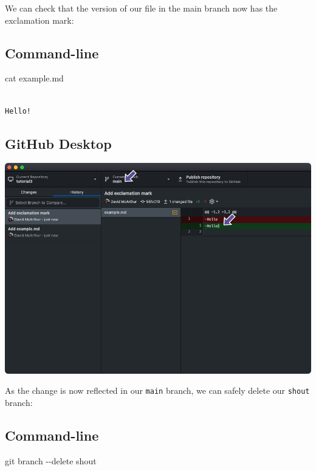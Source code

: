 \documentclass[
  letterpaper,
  DIV=11,
  numbers=noendperiod]{scrartcl}
\newenvironment{Shaded}{\begin{snugshade}}{\end{snugshade}}
\newcommand{\NormalTok}[1]{\textcolor[rgb]{0.00,0.23,0.31}{#1}}
\newcommand{\SpecialCharTok}[1]{\textcolor[rgb]{0.37,0.37,0.37}{#1}}
\begin{document}
We can check that the version of our file in the main branch now has the
exclamation mark:

\subsection{Command-line}

\begin{Shaded}
\begin{Highlighting}[]
\NormalTok{cat example.md}
\end{Highlighting}
\end{Shaded}

\begin{verbatim}

Hello!
\end{verbatim}

\subsection{GitHub Desktop}

\includegraphics{images/image35.png}

As the change is now reflected in our \texttt{main} branch, we can
safely delete our \texttt{shout} branch:

\subsection{Command-line}

\begin{Shaded}
\begin{Highlighting}[]
\NormalTok{git branch }\SpecialCharTok{{-}{-}}\NormalTok{delete shout}
\end{Highlighting}
\end{Shaded}
\end{document}
